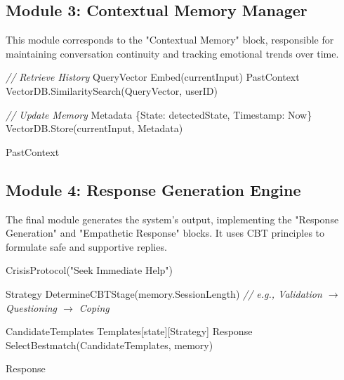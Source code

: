 \subsection{Module 3: Contextual Memory Manager}
This module corresponds to the "Contextual Memory" block, responsible for maintaining conversation continuity and tracking emotional trends over time.

\begin{algorithm}[H]
\caption{Context Retrieval Algorithm}
\begin{algorithmic}[1]
    \State \textit{// Retrieve History}
    \State QueryVector \gets Embed(currentInput)
    \State PastContext \gets VectorDB.SimilaritySearch(QueryVector, userID)
    
    \State \textit{// Update Memory}
    \State Metadata \gets \{State: detectedState, Timestamp: Now\}
    \State VectorDB.Store(currentInput, Metadata)
    
    \State \Return PastContext
\EndProcedure
\end{algorithmic}
\end{algorithm}

\subsection{Module 4: Response Generation Engine}
The final module generates the system's output, implementing the "Response Generation" and "Empathetic Response" blocks. It uses CBT principles to formulate safe and supportive replies.

\begin{algorithm}[H]
\caption{CBT Response Algorithm}
\begin{algorithmic}[1]
        \State \Return CrisisProtocol("Seek Immediate Help")
    \EndIf
    
    \State Strategy \gets DetermineCBTStage(memory.SessionLength)
    \State \textit{// e.g., Validation $\to$ Questioning $\to$ Coping}
    
    \State CandidateTemplates \gets Templates[state][Strategy]
    \State Response \gets SelectBestmatch(CandidateTemplates, memory)
    
    \State \Return Response
\EndProcedure
\end{algorithmic}
\end{algorithm}
